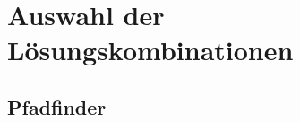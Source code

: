 \documentclass{scrarticle}                %
\begin{document}
\newpage


\tableofcontents
\thispagestyle{nofooter}
\newpage

\setcounter{page}{1}

\section{Auswahl der Lösungskombinationen}

\subsection{Pfadfinder} %

\newpage

\newpage

\newpage


\newpage

\newpage

\newpage



\newpage
\end{document}

